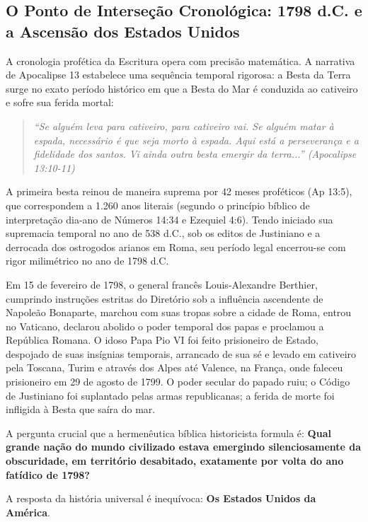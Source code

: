 \documentclass[11pt,a4paper,openany]{book}
\begin{document}
\subsection{O Ponto de Interseção Cronológica: 1798 d.C. e a Ascensão dos Estados Unidos}


A cronologia profética da Escritura opera com precisão matemática. A narrativa de Apocalipse 13 estabelece uma sequência temporal rigorosa: a Besta da Terra surge no exato período histórico em que a Besta do Mar é conduzida ao cativeiro e sofre sua ferida mortal:


\begin{quote}
\itshape \textit{``Se alguém leva para cativeiro, para cativeiro vai. Se alguém matar à espada, necessário é que seja morto à espada. Aqui está a perseverança e a fidelidade dos santos. Vi ainda outra besta emergir da terra...''} (Apocalipse 13:10-11)
\end{quote}


A primeira besta reinou de maneira suprema por 42 meses proféticos (Ap 13:5), que correspondem a 1.260 anos literais (segundo o princípio bíblico de interpretação dia-ano de Números 14:34 e Ezequiel 4:6). Tendo iniciado sua supremacia temporal no ano de 538 d.C., sob os editos de Justiniano e a derrocada dos ostrogodos arianos em Roma, seu período legal encerrou-se com rigor milimétrico no ano de 1798 d.C.

Em 15 de fevereiro de 1798, o general francês Louis-Alexandre Berthier, cumprindo instruções estritas do Diretório sob a influência ascendente de Napoleão Bonaparte, marchou com suas tropas sobre a cidade de Roma, entrou no Vaticano, declarou abolido o poder temporal dos papas e proclamou a República Romana. O idoso Papa Pio VI foi feito prisioneiro de Estado, despojado de suas insígnias temporais, arrancado de sua sé e levado em cativeiro pela Toscana, Turim e através dos Alpes até Valence, na França, onde faleceu prisioneiro em 29 de agosto de 1799. O poder secular do papado ruiu; o Código de Justiniano foi suplantado pelas armas republicanas; a ferida de morte foi infligida à Besta que saíra do mar.

A pergunta crucial que a hermenêutica bíblica historicista formula é: \textbf{Qual grande nação do mundo civilizado estava emergindo silenciosamente da obscuridade, em território desabitado, exatamente por volta do ano fatídico de 1798?}

A resposta da história universal é inequívoca: \textbf{Os Estados Unidos da América}.
\end{document}
